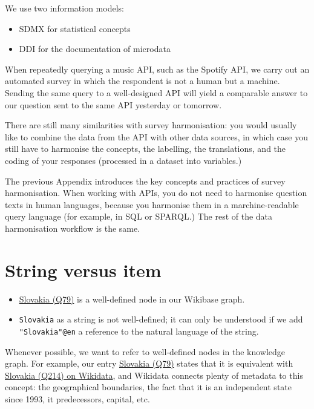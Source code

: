 \documentclass[
  letterpaper,
  DIV=11,
  numbers=noendperiod]{scrreprt}
\providecommand{\tightlist}{%
  \setlength{\itemsep}{0pt}\setlength{\parskip}{0pt}}\usepackage{longtable,booktabs,array}
\begin{document}
We use two information models:

\begin{itemize}
\tightlist
\item
  SDMX for statistical concepts
\item
  DDI for the documentation of microdata
\end{itemize}

When repeatedly querying a music API, such as the Spotify API, we carry
out an automated survey in which the respondent is not a human but a
machine. Sending the same query to a well-designed API will yield a
comparable answer to our question sent to the same API yesterday or
tomorrow.

There are still many similarities with survey harmonisation: you would
usually like to combine the data from the API with other data sources,
in which case you still have to harmonise the concepts, the labelling,
the translations, and the coding of your responses (processed in a
dataset into variables.)

The previous Appendix introduces the key concepts and practices of
survey harmonisation. When working with APIs, you do not need to
harmonise question texts in human languages, because you harmonise them
in a marchine-readable query language (for example, in SQL or SPARQL.)
The rest of the data harmonisation workflow is the same.

\section{String versus item}\label{string-versus-item}

\begin{itemize}
\tightlist
\item
  \href{https://reprexbase.eu/demowiki/index.php?title=Item:Q79}{Slovakia
  (Q79)} is a well-defined node in our Wikibase graph.
\item
  \texttt{Slovakia} as a string is not well-defined; it can only be
  understood if we add \texttt{"Slovakia"@en} a reference to the natural
  language of the string.
\end{itemize}

Whenever possible, we want to refer to well-defined nodes in the
knowledge graph. For example, our entry
\href{https://reprexbase.eu/demowiki/index.php?title=Item:Q79}{Slovakia
(Q79)} states that it is equivalent with
\href{https://www.wikidata.org/wiki/Q214}{Slovakia (Q214) on Wikidata},
and Wikidata connects plenty of metadata to this concept: the
geographical boundaries, the fact that it is an independent state since
1993, it predecessors, capital, etc.
\end{document}
